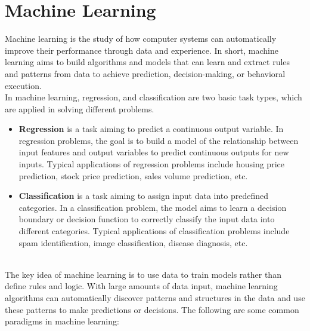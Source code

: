 \documentclass[english,version-2022-01]{uzl-thesis}
\begin{document}
\section{Machine Learning}
Machine learning is the study of how computer systems can automatically improve their performance through data and experience. In short, machine learning aims to build algorithms and models that can learn and extract rules and patterns from data to achieve prediction, decision-making, or behavioral execution.\cite{mitchell1990machine}\\In machine learning, regression, and classification are two basic task types, which are applied in solving different problems. \\
\begin{itemize}
    \item \textbf{Regression} is a task aiming to predict a continuous output variable. In regression problems, the goal is to build a model of the relationship between input features and output variables to predict continuous outputs for new inputs. Typical applications of regression problems include housing price prediction, stock price prediction, sales volume prediction, etc. \\
    \item \textbf{Classification} is a task aiming to assign input data into predefined categories. In a classification problem, the model aims to learn a decision boundary or decision function to correctly classify the input data into different categories. Typical applications of classification problems include spam identification, image classification, disease diagnosis, etc.
\end{itemize}
\\
The key idea of machine learning is to use data to train models rather than define rules and logic. With large amounts of data input, machine learning algorithms can automatically discover patterns and structures in the data and use these patterns to make predictions or decisions. The following are some common paradigms in machine learning:
\end{document}
